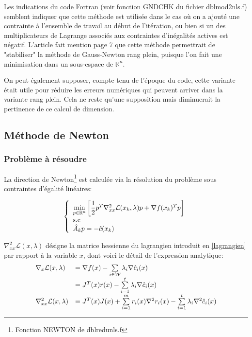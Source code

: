 \documentclass[a4paper,11pt]{article}
\newcommand{\real}{\mathbb{R}}
\newcommand{\ha}{\hat{A}}
\newcommand{\hc}{\hat{c}}
\numberwithin{equation}{section}
\begin{document}
Les indications du code Fortran (voir fonction GNDCHK du fichier dblmod2nls.f) semblent indiquer que cette méthode est utilisée dans le cas où on a ajouté une contrainte à l'ensemble de travail au début de l'itération, ou bien si un des multiplicateurs de Lagrange associés aux contraintes d'inégalités actives est négatif. L'article \cite{lindstromwedin1988} fait mention page 7 que cette méthode permettrait de "stabiliser" la méthode de Gauss-Newton rang plein, puisque l'on fait une minimisation dans un sous-espace de $\real^{n}$. 

On peut également supposer, compte tenu de l'époque du code, cette variante était utile pour réduire les erreurs numériques qui peuvent arriver dans la variante rang plein. Cela ne reste qu'une supposition mais diminuerait la pertinence de ce calcul de dimension.


\subsection{Méthode de Newton} \label{newtonmethod}

\subsubsection{Problème à résoudre}

La direction de Newton\footnote{Fonction NEWTON de dblredunls.f} est calculée via la résolution du problème sous contraintes d'égalité linéaires:

$$
\left\{ \begin{array}{l l l}
\underset{p \in \real^{n}}{\min}\left[ \dfrac{1}{2}p^{T}\nabla_{xx}^{2}\mathcal{L}(x_{k},\lambda)p + \nabla f(x_{k})^{T}p\right]\\
\text{s.c}\\
\ha_{k} p = -\hat{c}(x_{k})
\end{array} \right.
$$

$\nabla^{2}_{xx}\mathcal{L}(x,\lambda)$ désigne la matrice hessienne du lagrangien introduit en \ref{lagrangien} par rapport à la variable $x$, dont voici le détail de l'expression analytique:
\[
\begin{array}{l l l}\nabla_{x}\mathcal{L}(x,\lambda)&=\nabla f(x) - \sum\limits_{i \in \mathcal{W}} \lambda_{i}\nabla \hc_{i}(x)\\
&= J^{T}(x)r(x) - \sum\limits_{i=1}^{t} \lambda_{i}\nabla \hc_{i}(x)\\
\nabla^{2}_{xx}\mathcal{L}(x,\lambda) &= J^{T}(x)J(x)+ \sum\limits_{i=1}^{m}r_i(x)\nabla^2r_i(x) - \sum\limits_{i=1}^{t}\lambda_i\nabla^2\hc_{i}(x)
\end{array}
\]
\end{document}
